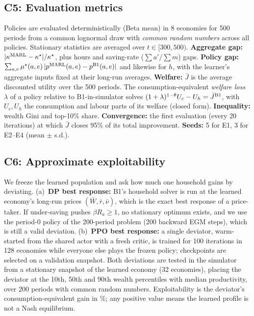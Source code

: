\subsection{C5: Evaluation metrics}
Policies are evaluated deterministically (Beta mean) in 8 economies for 500 periods from a common lognormal draw with
\emph{common random numbers} across all policies. Stationary statistics are averaged over $t\in[300,500)$.
\textbf{Aggregate gap:} $|\kappa^{\rm MARL}-\kappa^\star|/\kappa^\star$, plus hours and saving-rate ($\sum a'/\sum m$) gaps.
\textbf{Policy gap:} $\sum_{a,e}\mu^\star(a,e)\,|p^{\rm MARL}(a,e)-p^{\rm B1}(a,e)|$ and likewise for $h$, with the
learner's aggregate inputs fixed at their long-run averages.
\textbf{Welfare:} $\bar J$ is the average discounted utility over the 500 periods. The consumption-equivalent
\emph{welfare loss} $\lambda$ of a policy relative to B1-in-simulator solves
$(1+\lambda)^{1-\theta}U_c-U_h=\bar J^{\rm B1}$, with $U_c,U_h$ the consumption and labour parts of its welfare
(closed form).
\textbf{Inequality:} wealth Gini and top-10\% share. \textbf{Convergence:} the first evaluation (every 20 iterations)
at which $\bar J$ closes 95\% of its total improvement. \textbf{Seeds:} 5 for E1, 3 for E2--E4 (mean $\pm$ s.d.).

\subsection{C6: Approximate exploitability}
We freeze the learned population and ask how much one household gains by deviating. (a)~\textbf{DP best response:}
B1's household solver is run at the learned economy's long-run prices $(\bar W,\bar r,\bar\nu)$, which is the exact
best response of a price-taker. If under-saving pushes $\beta R_a\ge1$, no stationary optimum exists, and we use the
period-0 policy of the 200-period problem (200 backward EGM steps), which is still a valid deviation. (b)~\textbf{PPO best response:} a single deviator, warm-started from the shared actor
with a fresh critic, is trained for 100 iterations in 128 economies while everyone else plays the frozen policy;
checkpoints are selected on a validation snapshot. Both deviations are tested in the simulator from a stationary
snapshot of the learned economy (32 economies), placing the deviator at the 10th, 50th and 90th wealth percentiles
with median productivity, over 200 periods with common random numbers. Exploitability is the deviator's
consumption-equivalent gain in \%; any positive value means the learned profile is not a Nash equilibrium.
